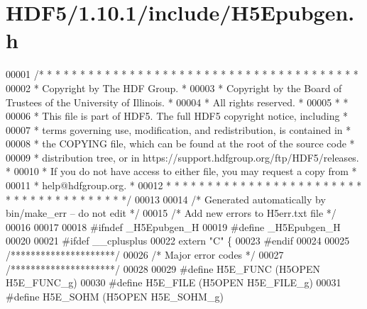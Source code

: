 \hypertarget{_h_d_f5_21_810_81_2include_2_h5_epubgen_8h_source}{}\section{H\+D\+F5/1.10.1/include/\+H5\+Epubgen.h}
\label{_h_d_f5_21_810_81_2include_2_h5_epubgen_8h_source}

\begin{DoxyCode}
00001 \textcolor{comment}{/* * * * * * * * * * * * * * * * * * * * * * * * * * * * * * * * * * * * * * *}
00002 \textcolor{comment}{ * Copyright by The HDF Group.                                               *}
00003 \textcolor{comment}{ * Copyright by the Board of Trustees of the University of Illinois.         *}
00004 \textcolor{comment}{ * All rights reserved.                                                      *}
00005 \textcolor{comment}{ *                                                                           *}
00006 \textcolor{comment}{ * This file is part of HDF5.  The full HDF5 copyright notice, including     *}
00007 \textcolor{comment}{ * terms governing use, modification, and redistribution, is contained in    *}
00008 \textcolor{comment}{ * the COPYING file, which can be found at the root of the source code       *}
00009 \textcolor{comment}{ * distribution tree, or in https://support.hdfgroup.org/ftp/HDF5/releases.  *}
00010 \textcolor{comment}{ * If you do not have access to either file, you may request a copy from     *}
00011 \textcolor{comment}{ * help@hdfgroup.org.                                                        *}
00012 \textcolor{comment}{ * * * * * * * * * * * * * * * * * * * * * * * * * * * * * * * * * * * * * * */}
00013 
00014 \textcolor{comment}{/* Generated automatically by bin/make\_err -- do not edit */}
00015 \textcolor{comment}{/* Add new errors to H5err.txt file */}
00016 
00017 
00018 \textcolor{preprocessor}{#ifndef \_H5Epubgen\_H}
00019 \textcolor{preprocessor}{#define \_H5Epubgen\_H}
00020 
00021 \textcolor{preprocessor}{#ifdef \_\_cplusplus}
00022 \textcolor{keyword}{extern} \textcolor{stringliteral}{"C"} \{
00023 \textcolor{preprocessor}{#endif}
00024 
00025 \textcolor{comment}{/*********************/}
00026 \textcolor{comment}{/* Major error codes */}
00027 \textcolor{comment}{/*********************/}
00028 
00029 \textcolor{preprocessor}{#define H5E\_FUNC             (H5OPEN H5E\_FUNC\_g)}
00030 \textcolor{preprocessor}{#define H5E\_FILE             (H5OPEN H5E\_FILE\_g)}
00031 \textcolor{preprocessor}{#define H5E\_SOHM             (H5OPEN H5E\_SOHM\_g)}

\end{DoxyCode}
